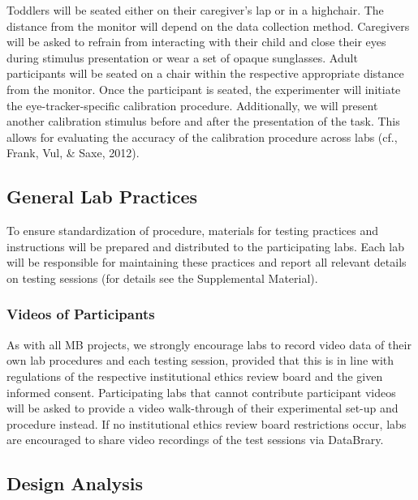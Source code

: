 \documentclass[
  english,
  man,floatsintext]{apa6}
\begin{document}
Toddlers will be seated either on their caregiver's lap or in a highchair. The distance from the monitor will depend on the data collection method. Caregivers will be asked to refrain from interacting with their child and close their eyes during stimulus presentation or wear a set of opaque sunglasses. Adult participants will be seated on a chair within the respective appropriate distance from the monitor. Once the participant is seated, the experimenter will initiate the eye-tracker-specific calibration procedure. Additionally, we will present another calibration stimulus before and after the presentation of the task. This allows for evaluating the accuracy of the calibration procedure across labs (cf., Frank, Vul, \& Saxe, 2012).

\hypertarget{general-lab-practices}{%
\subsection{General Lab Practices}\label{general-lab-practices}}

To ensure standardization of procedure, materials for testing practices and instructions will be prepared and distributed to the participating labs. Each lab will be responsible for maintaining these practices and report all relevant details on testing sessions (for details see the Supplemental Material).

\hypertarget{videos-of-participants}{%
\subsubsection{Videos of Participants}\label{videos-of-participants}}

As with all MB projects, we strongly encourage labs to record video data of their own lab procedures and each testing session, provided that this is in line with regulations of the respective institutional ethics review board and the given informed consent. Participating labs that cannot contribute participant videos will be asked to provide a video walk-through of their experimental set-up and procedure instead. If no institutional ethics review board restrictions occur, labs are encouraged to share video recordings of the test sessions via DataBrary.

\hypertarget{design-analysis}{%
\subsection{Design Analysis}\label{design-analysis}}
\end{document}
